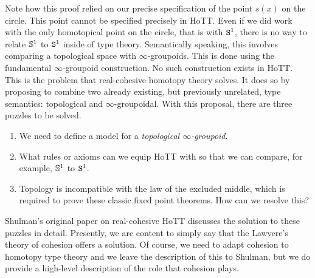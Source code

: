 \documentclass{amsart}
\begin{document}
Note how this proof relied on our precise specification of
the point $ s(x) $ on the circle.  This point cannot be
specified precisely in HoTT. Even if we did work with the
only homotopical point on the circle, that is with $ \S^1 $,
there is no way to relate $ \SS^1 $ to $ \S^1 $ inside of
type theory. Semantically speaking, this involves comparing
a topological space with $ \infty $-groupoids. This is done
using the fundamental $ \infty $-groupoid construction.  No
such construction exists in HoTT. This is the problem that
real-cohesive homotopy theory solves. It does so by
proposing to combine two already existing, but previously
unrelated, type semantics: topological and
$ \infty $-groupoidal. With this proposal, there are three
puzzles to be solved.

\begin{enumerate}
\item We need to define a model for a \emph{topological $ \infty
    $-groupoid}.
\item What rules or axioms can we equip HoTT with so that we
  can compare, for example, $ \SS^1 $ to $ \S^1 $.
\item Topology  is incompatible with the law of the excluded
  middle, which is required to prove these classic fixed
  point theorems. How can we resolve this?
\end{enumerate}

Shulman's original paper on real-cohesive HoTT
\cite{shul:bfp} discusses the solution to these puzzles in
detail. Presently, we are content to simply say that the
Lawvere's theory of cohesion offers a solution. Of course,
we need to adapt cohesion to homotopy type theory and we
leave the description of this to Shulman, but we do provide
a high-level description of the role that cohesion plays.
\end{document}
